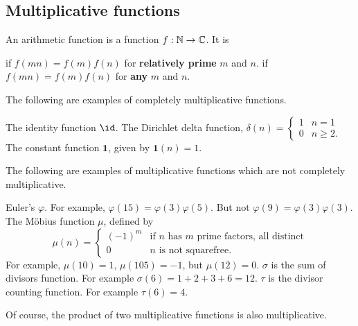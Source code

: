 \documentclass[11pt]{scrartcl}
\begin{document}
\subsection{Multiplicative functions}
\begin{definition}
  An arithmetic function is a function $f : \mathbb N \to \mathbb C$.
  It is
  \begin{itemize}
    \ii {} if $f(mn) = f(m) f(n)$
    for \textbf{relatively prime} $m$ and $n$.
    \ii {} if $f(mn) = f(m)f(n)$
    for \textbf{any} $m$ and $n$.
  \end{itemize}
\end{definition}

\begin{example}
  The following are examples of completely multiplicative functions.
  \begin{itemize}
    \ii The identity function $\id$.
    \ii The Dirichlet delta function, $\delta(n) =
    \begin{cases}
      1 & n = 1 \\
      0 & n \ge 2.
    \end{cases}$
    \ii The constant function $\mathbf 1$,
    given by $\mathbf 1(n) = 1$.
  \end{itemize}
\end{example}

\begin{example}
  The following are examples of multiplicative functions
  which are not completely multiplicative.
  \begin{itemize}
    \ii Euler's $\varphi$. For example, $\varphi(15) = \varphi(3)\varphi(5)$.
    But not $\varphi(9) = \varphi(3)\varphi(3)$.
    \ii The M\"obius function $\mu$, defined by
    \[
      \mu(n)
      =
      \begin{cases}
        (-1)^m & \text{if $n$ has $m$ prime factors, all distinct} \\
        0 & \text{$n$ is not squarefree}.
      \end{cases}
    \]
    For example, $\mu(10) = 1$, $\mu(105) = -1$, but $\mu(12) = 0$.
    \ii $\sigma$ is the sum of divisors function.
    For example $\sigma(6) = 1+2+3+6 = 12$.
    \ii $\tau$ is the divisor counting function.
    For example $\tau(6) = 4$.
  \end{itemize}
\end{example}

Of course, the product of two multiplicative functions is also multiplicative.
\end{document}
